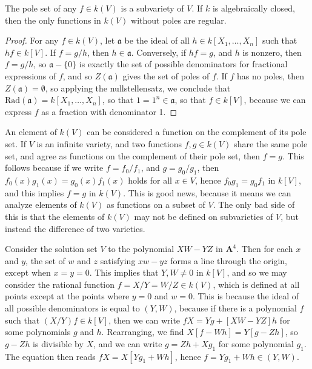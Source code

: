 \begin{prop}
    The pole set of any $f \in k(V)$ is a subvariety of $V$. If $k$ is algebraically closed, then the only functions in $k(V)$ without poles are regular.
\end{prop}
\begin{proof}
    For any $f \in k(V)$, let $\mathfrak{a}$ be the ideal of all $h \in k[X_1, \dots, X_n]$ such that $hf \in k[V]$. If $f = g/h$, then $h \in \mathfrak{a}$. Conversely, if $hf = g$, and $h$ is nonzero, then $f = g/h$, so $\mathfrak{a} - \{ 0 \}$ is exactly the set of possible denominators for fractional expressions of $f$, and so $Z(\mathfrak{a})$ gives the set of poles of $f$. If $f$ has no poles, then $Z(\mathfrak{a}) = \emptyset$, so applying the nullstellensatz, we conclude that $\text{Rad}(\mathfrak{a}) = k[X_1, \dots, X_n]$, so that $1 = 1^n \in \mathfrak{a}$, so that $f \in k[V]$, because we can express $f$ as a fraction with denominator 1.
\end{proof}

An element of $k(V)$ can be considered a function on the complement of its pole set. If $V$ is an infinite variety, and two functions $f,g \in k(V)$ share the same pole set, and agree as functions on the complement of their pole set, then $f = g$. This follows because if we write $f = f_0/f_1$, and $g = g_0/g_1$, then $f_0(x) g_1(x) = g_0(x) f_1(x)$ holds for all $x \in V$, hence $f_0g_1 = g_0f_1$ in $k[V]$, and this implies $f = g$ in $k(V)$. This is good news, because it means we can analyze elements of $k(V)$ as functions on a subset of $V$. The only bad side of this is that the elements of $k(V)$ may not be defined on subvarieties of $V$, but instead the difference of two varieties.

\begin{example}
    Consider the solution set $V$ to the polynomial $XW - YZ$ in $\mathbf{A}^4$. Then for each $x$ and $y$, the set of $w$ and $z$ satisfying $xw - yz$ forms a line through the origin, except when $x = y = 0$. This implies that $Y,W \neq 0$ in $k[V]$, and so we may consider the rational function $f = X/Y = W/Z \in k(V)$, which is defined at all points except at the points where $y = 0$ and $w = 0$. This is because the ideal of all possible denominators is equal to $(Y,W)$, because if there is a polynomial $f$ such that $(X/Y)f \in k[V]$, then we can write $fX = Yg + [XW - YZ]h$ for some polynomials $g$ and $h$. Rearranging, we find $X[f - Wh] = Y[g-Zh]$, so $g - Zh$ is divisible by $X$, and we can write $g = Zh + Xg_1$ for some polynomial $g_1$. The equation then reads $fX = X[Yg_1 + Wh]$, hence $f = Yg_1 + Wh \in (Y,W)$.
\end{example}


